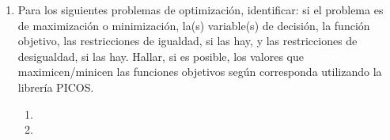 \documentclass[12pt]{article}
\begin{document}
\begin{enumerate}
\begin{enumerate}[label=\alph*)]
        \item {}

        \item {}

        \item {}
    \end{enumerate}
    
    \item Para los siguientes problemas de optimización, identificar: si el problema es de maximización o minimización, la(s) variable(s) de decisión, la función objetivo, las restricciones de igualdad, si las hay, y las restricciones de desigualdad, si las hay. Hallar, si es posible, los valores que maximicen/minicen las funciones objetivos según corresponda utilizando la librería PICOS.
    \begin{enumerate}[label=\alph*)]
        \item {}

        \item {}


\end{enumerate}
\end{enumerate}
\end{document}
